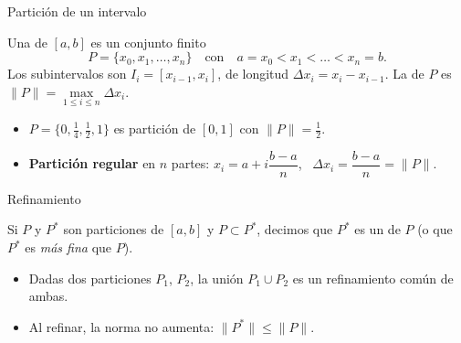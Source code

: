 \documentclass[10pt,aspectratio=169]{beamer}
\begin{document}
\begin{frame}{Partición de un intervalo}
  \begin{definicion}[partición]
    Una  de $[a,b]$ es un conjunto finito
    \[ P=\{x_0,x_1,\dots,x_n\}\quad\text{con}\quad a=x_0<x_1<\dots<x_n=b. \]
    Los subintervalos son $I_i=[x_{i-1},x_i]$, de longitud $\Delta x_i=x_i-x_{i-1}$.
    La  de $P$ es $\|P\|=\max\limits_{1\le i\le n}\Delta x_i$.
  \end{definicion}
  \begin{center}
  \end{center}
  \begin{ejemplo}
    \begin{itemize}
      \item $P=\{0,\tfrac14,\tfrac12,1\}$ es partición de $[0,1]$ con $\|P\|=\tfrac12$.
      \item \textbf{Partición regular} en $n$ partes: $x_i=a+i\dfrac{b-a}{n}$, \ $\Delta x_i=\dfrac{b-a}{n}=\|P\|$.
    \end{itemize}
  \end{ejemplo}
\end{frame}

\begin{frame}{Refinamiento}
  \begin{definicion}[refinamiento]
    Si $P$ y $P^*$ son particiones de $[a,b]$ y $P\subset P^*$, decimos que $P^*$ es un
     de $P$ (o que $P^*$ es \emph{más fina} que $P$).
  \end{definicion}
  \begin{center}
  \end{center}
  \begin{observacion}
    \begin{itemize}
      \item Dadas dos particiones $P_1$, $P_2$, la unión $P_1\cup P_2$ es un refinamiento común de ambas.
      \item Al refinar, la norma no aumenta: $\|P^*\|\le\|P\|$.
    \end{itemize}
  \end{observacion}
\end{frame}
\end{document}
